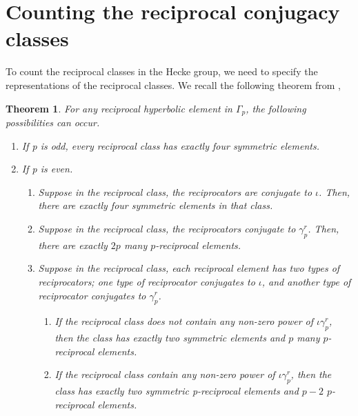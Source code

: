 \documentclass[11pt]{amsart}
\numberwithin{equation}{section}
\newtheorem{theorem}{Theorem}[section]
\theoremstyle{definition}
\newcommand{\g}{\gamma_{p}}
\numberwithin{equation}{section}
\begin{document}
	
	\section{Counting the reciprocal conjugacy classes}\label{3}
	To count the reciprocal classes in the Hecke group, we need to specify the representations of the reciprocal classes. We recall the following theorem from \cite{DG},
	\begin{theorem}{\cite{DG}}\label{th}
		For any reciprocal hyperbolic element in $ \Gamma_{p} $, the following possibilities can occur.
		\begin{enumerate}
			\item If p is odd, every reciprocal class has exactly four symmetric elements.
			\item If p is even.
			\begin{enumerate}
				\item Suppose in the reciprocal class, the reciprocators are conjugate to $ \iota $. Then, there are exactly four symmetric elements in that class.
				\item Suppose in the reciprocal class, the reciprocators conjugate to $\gamma_{p}^{r} $. Then, there are exactly $ 2p $ many $p$-reciprocal elements. 
				\item Suppose in the reciprocal class, each reciprocal element has two types of reciprocators; one type of reciprocator conjugates to $ \iota $, and another type of reciprocator conjugates to $ \gamma_{p}^{r} $.
				\begin{enumerate}
					
					\item If the reciprocal class does not contain any non-zero power of $ \iota \g^r$, then the class has exactly two symmetric elements and $ p $ many $p$-reciprocal elements.
					
					
					\item If the reciprocal class contain any non-zero power of $ \iota \g^r$, then the class has exactly two symmetric p-reciprocal elements and $p-2$  $p$-reciprocal elements.			\end{enumerate}
			\end{enumerate}
		\end{enumerate}
		
	\end{theorem}
	
\end{document}
